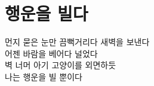 \hypertarget{uxd589uxc6b4uxc744-uxbe4cuxb2e4}{%

\chapter{행운을 빌다}\label{uxd589uxc6b4uxc744-uxbe4cuxb2e4}}



먼지 묻은 눈만 끔뻑거리다 새벽을 보낸다\\

어젠 바람을 베어다 널었다\\

벽 너머 아기 고양이를 외면하듯\\

나는 행운을 빌 뿐이다

